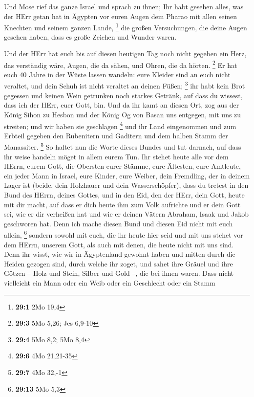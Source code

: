 Und Mose rief das ganze Israel und sprach zu ihnen; Ihr
habt gesehen alles, was der HErr getan hat in Ägypten vor euren Augen
dem Pharao mit allen seinen Knechten und seinem ganzen Lande,
\footnote{\textbf{29:1} 2Mo 19,4}  die großen Versuchungen,
die deine Augen gesehen haben, dass es große Zeichen und Wunder waren.

 Und der HErr hat euch bis auf diesen heutigen Tag noch
nicht gegeben ein Herz, das verständig wäre, Augen, die da sähen, und
Ohren, die da hörten. \footnote{\textbf{29:3} 5Mo 5,26; Jes 6,9-10}
 Er hat euch 40 Jahre in der Wüste lassen wandeln: eure
Kleider sind an euch nicht veraltet, und dein Schuh ist nicht veraltet
an deinen Füßen; \footnote{\textbf{29:4} 5Mo 8,2; 5Mo 8,4} 
ihr habt kein Brot gegessen und keinen Wein getrunken noch starkes
Getränk, auf dass du wissest, dass ich der HErr, euer Gott, bin.
 Und da ihr kamt an diesen Ort, zog aus der König Sihon zu
Hesbon und der König Og von Basan uns entgegen, mit uns zu streiten; und
wir haben sie geschlagen \footnote{\textbf{29:6} 4Mo 21,21-35}
 und ihr Land eingenommen und zum Erbteil gegeben den
Rubenitern und Gaditern und dem halben Stamm der Manassiter. \footnote{\textbf{29:7}
  4Mo 32,-1}  So haltet nun die Worte dieses Bundes und tut
darnach, auf dass ihr weise handeln möget in allem eurem Tun.
 Ihr stehet heute alle vor dem HErrn, eurem Gott, die
Obersten eurer Stämme, eure Ältesten, eure Amtleute, ein jeder Mann in
Israel,  eure Kinder, eure Weiber, dein Fremdling, der in
deinem Lager ist (beide, dein Holzhauer und dein Wasserschöpfer),
 dass du tretest in den Bund des HErrn, deines Gottes, und
in den Eid, den der HErr, dein Gott, heute mit dir macht, 
auf dass er dich heute ihm zum Volk aufrichte und er dein Gott sei, wie
er dir verheißen hat und wie er deinen Vätern Abraham, Isaak und Jakob
geschworen hat.  Denn ich mache diesen Bund und diesen Eid
nicht mit euch allein, \footnote{\textbf{29:13} 5Mo 5,3} 
sondern sowohl mit euch, die ihr heute hier seid und mit uns stehet vor
dem HErrn, unserem Gott, als auch mit denen, die heute nicht mit uns
sind.  Denn ihr wisst, wie wir in Ägyptenland gewohnt haben
und mitten durch die Heiden gezogen sind, durch welche ihr zoget,
 und sahet ihre Gräuel und ihre Götzen -- Holz und Stein,
Silber und Gold --, die bei ihnen waren.  Dass nicht
vielleicht ein Mann oder ein Weib oder ein Geschlecht oder ein Stamm
